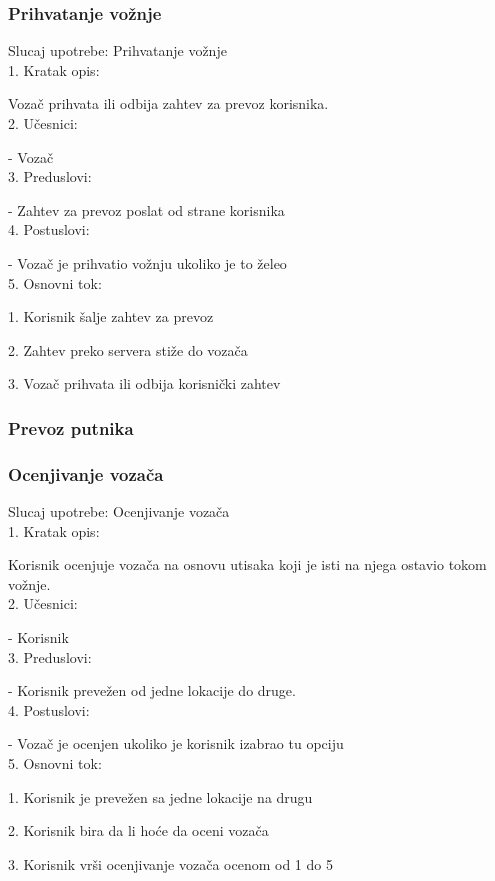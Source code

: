 \subsubsection{\bfseries Prihvatanje vo\v znje}
\noindent Slucaj upotrebe: Prihvatanje vožnje \\
1. Kratak opis:
\par Vozač prihvata ili odbija zahtev za prevoz korisnika. \\
2.  Učesnici:  
\par - Vozač \\
3. Preduslovi: 
\par - Zahtev za prevoz poslat od strane korisnika \\
4. Postuslovi:
\par - Vozač je prihvatio vožnju ukoliko je to želeo \\
5. Osnovni tok:
\par 1. Korisnik šalje zahtev za prevoz
\par 2.  Zahtev preko servera stiže do vozača
\par 3.  Vozač prihvata ili odbija korisnički zahtev \\

\subsubsection{\bfseries Prevoz putnika}
\subsubsection{\bfseries Ocenjivanje voza\v ca}
\noindent Slucaj upotrebe: Ocenjivanje vozača \\
1. Kratak opis: 
\par Korisnik ocenjuje vozača na osnovu utisaka koji je isti na njega ostavio tokom vožnje. \\
2.  Učesnici:  
\par - Korisnik \\
3. Preduslovi: 
\par - Korisnik prevežen od jedne lokacije do druge. \\
4. Postuslovi:
\par - Vozač je ocenjen ukoliko je korisnik izabrao tu opciju \\
5. Osnovni tok:
\par 1. Korisnik je prevežen sa jedne lokacije na drugu
\par 2.  Korisnik bira da li hoće da oceni vozača
\par 3.  Korisnik vrši ocenjivanje vozača ocenom od 1 do 5 \\

